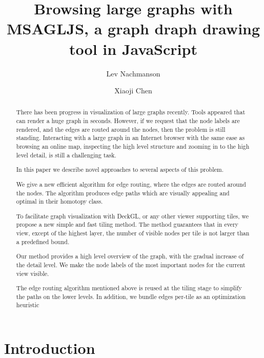 \documentclass{gd-llncs}
\begin{document}
\title{Browsing large graphs with MSAGLJS, a graph draph drawing tool in JavaScript }
\author{%
  Lev Nachmanson  \and
  Xiaoji Chen
}%
\maketitle

\begin{abstract}
  There has been progress in visualization of large graphs recently. Tools appeared that can render a huge graph in seconds. However, if we request that the node labels are rendered, and the edges are routed around the nodes, then the problem is still standing. Interacting with a large graph in an Internet browser with the same ease as browsing an online map, inspecting the high level structure and zooming in to the high level detail, is still a challenging task.
   
  In this paper we describe novel approaches to several aspects of this problem.

  We give a new efficient algorithm for edge routing, where the edges are routed around the nodes. The algorithm produces edge paths which are visually appealing and optimal in their homotopy class.

  To facilitate graph visualization with DeckGL, or any other viewer supporting tiles, we propose a new simple and fast tiling method. The method guarantees that in every view, except of the highest layer, the number of visible nodes per tile is not larger than a predefined bound.

  Our method provides a high level overview of the graph, with the gradual increase of the detail level. We make the node labels of the most important nodes for the current view visible.

  The edge routing algorithm mentioned above is reused at the tiling stage to simplify the paths on the lower levels. In addition, we bundle edges per-tile as an optimization heuristic
\end{abstract}


\section*{Introduction}

\label{sec:intro}
\end{document}
